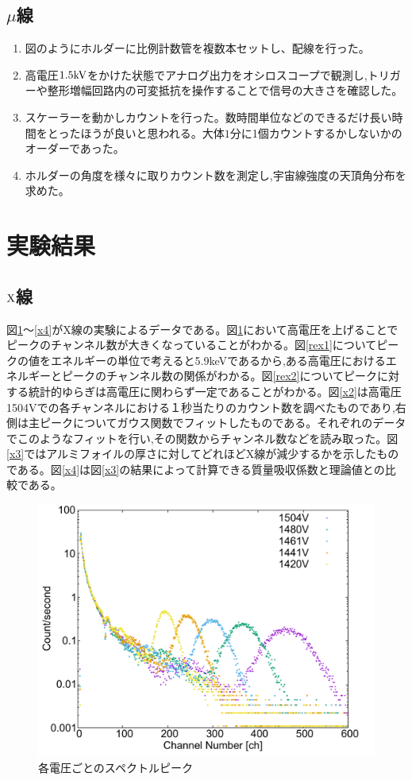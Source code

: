 \documentclass[a4j]{jsarticle}
\begin{document}
	\subsection{$\mu$線}
	\begin{enumerate}
	\item 図のようにホルダーに比例計数管を複数本セットし、配線を行った。
	\item 高電圧$1.5\rm{kV}$をかけた状態でアナログ出力をオシロスコープで観測し,トリガーや整形増幅回路内の可変抵抗を操作することで信号の大きさを確認した。
	\item スケーラーを動かしカウントを行った。数時間単位などのできるだけ長い時間をとったほうが良いと思われる。大体$1$分に1個カウントするかしないかのオーダーであった。
	\item ホルダーの角度を様々に取りカウント数を測定し,宇宙線強度の天頂角分布を求めた。
	\end{enumerate}
	
\section{実験結果}
	\subsection{$\rm{X}$線}
	図\ref{x1}〜\ref{x4}がX線の実験によるデータである。図\ref{x1}において高電圧を上げることでピークのチャンネル数が大きくなっていることがわかる。図\ref{rex1}についてピークの値をエネルギーの単位で考えると5.9keVであるから,ある高電圧におけるエネルギーとピークのチャンネル数の関係がわかる。図\ref{rex2}についてピークに対する統計的ゆらぎは高電圧に関わらず一定であることがわかる。図\ref{x2}は高電圧1504Vでの各チャンネルにおける１秒当たりのカウント数を調べたものであり,右側は主ピークについてガウス関数でフィットしたものである。それぞれのデータでこのようなフィットを行い,その関数からチャンネル数などを読み取った。図\ref{x3}ではアルミフォイルの厚さに対してどれほどX線が減少するかを示したものである。図\ref{x4}は図\ref{x3}の結果によって計算できる質量吸収係数と理論値との比較である。
	
	\begin{figure}[htbp]
	\centering
	\includegraphics[width=12cm]{xray_difvoltage.pdf}
	\caption{各電圧ごとのスペクトルピーク}
	\label{x1}
	\end{figure}
	
\end{document}
